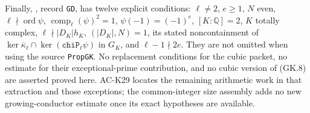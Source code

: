 Finally, , record
\texttt{GD}, has twelve explicit conditions: $\ell\ne2$,
$e\ge1$, $N$ even, $\ell\nmid\operatorname{ord}\psi$,
$\operatorname{comp}_\ell(\psi)^2=1$,
$\psi(-1)=(-1)^e$, $[K:\mathbb Q]=2$, $K$ totally complex,
$\ell\nmid|D_K|h_K$, $(|D_K|,N)=1$, its stated noncontainment
of $\ker\overline\kappa_\ell\cap\ker(\texttt{chiP}_\ell\psi)$
in $G_K$, and $\ell-1\nmid2e$.
They are not omitted when using the source \texttt{PropGK}.
No replacement conditions for the cubic packet, no estimate for
their exceptional-prime contribution, and no cubic version of
(GK.8) are asserted proved here.  AC-K29 locates the remaining
arithmetic work in that extraction and those exceptions; the
common-integer size assembly adds no new growing-conductor
estimate once its exact hypotheses are available.
